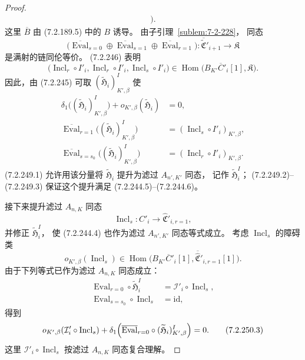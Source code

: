 \begin{proof}
\begin{equation}
\begin{aligned}
\Bigr).
\end{aligned}
\tag{7.2.247}\label{eq:7-2-247}
\end{equation}
这里 $\overline B$ 由 (7.2.189.5)
中的 $B$ 诱导。
由子引理~\ref{sublem:7-2-228}，
同态
\begin{equation}
\bigl(
\overline{\operatorname{Eval}}_{s=0}
\oplus\overline{\operatorname{Eval}}_{s=1}
\oplus\overline{\operatorname{Eval}}_{r=1}
\bigr)
\colon
\overline{\widetilde{\mathfrak C}}'_{i+1}
\longrightarrow\mathfrak K
\tag{7.2.248}\label{eq:7-2-248}
\end{equation}
是满射的链同伦等价。
(7.2.246) 表明
\[
\bigl(
\operatorname{Incl}_r\circ I'_i,
\operatorname{Incl}_r\circ I'_i,
\operatorname{Incl}_s\circ I'_i
\bigr)
\in\operatorname{Hom}\bigl(
B_{K'}\overline C'_i[1],\mathfrak K
\bigr).
\]
因此，由 (7.2.245) 可取
$(\widetilde{\mathfrak H}_i)^I_{K',\beta}$
使
\begin{align}
\delta_1\bigl(
(\widetilde{\mathfrak H}_i)^I_{K',\beta}
\bigr)
+o_{K',\beta}(\widetilde{\mathfrak H}_i)
&=0,
\tag{7.2.249.1}\label{eq:7-2-249-1}\\
\overline{\operatorname{Eval}}_{r=1}
\bigl((\widetilde{\mathfrak H}_i)^I_{K',\beta}\bigr)
&=(\operatorname{Incl}_s\circ I'_i)_{K',\beta},
\tag{7.2.249.2}\label{eq:7-2-249-2}\\
\overline{\operatorname{Eval}}_{s=s_0}
\bigl((\widetilde{\mathfrak H}_i)^I_{K',\beta}\bigr)
&=(\operatorname{Incl}_r\circ I'_i)_{K',\beta}.
\tag{7.2.249.3}\label{eq:7-2-249-3}
\end{align}
(7.2.249.1) 允许用该分量将
$\widetilde{\mathfrak H}_i$
提升为滤过 $A_{n',K'}$ 同态，
记作 $\widetilde{\mathfrak H}_i^I$；
(7.2.249.2)--(7.2.249.3)
保证这个提升满足
(7.2.244.5)--(7.2.244.6)。

接下来提升滤过 $A_{n,K}$ 同态
\[
\operatorname{Incl}_s\colon C'_i\to
\widehat{\mathfrak C}'_{i,r=1},
\]
并修正 $\widetilde{\mathfrak H}_i^I$，
使 (7.2.244.4) 也作为滤过
$A_{n',K'}$ 同态等式成立。
考虑 $\operatorname{Incl}_s$ 的障碍类
\[
o_{K',\beta}(\operatorname{Incl}_s)
\in\operatorname{Hom}\bigl(
B_{K'}\overline C'_i[1],
\overline{\widehat{\mathfrak C}}'_{i,r=1}[1]
\bigr).
\]
由于下列等式已作为滤过 $A_{n,K}$
同态成立：
\begin{align}
\operatorname{Eval}_{r=0}\circ
\widetilde{\mathfrak H}_i^I
&=\mathcal I'_i\circ\operatorname{Incl}_s,
\tag{7.2.250.1}\label{eq:7-2-250-1}\\
\operatorname{Eval}_{s=s_0}\circ
\operatorname{Incl}_s
&=\mathrm{id},
\tag{7.2.250.2}\label{eq:7-2-250-2}
\end{align}
得到
\begin{equation}
o_{K',\beta}(\mathcal I'_i\circ
\operatorname{Incl}_s)
+\delta_1\Bigl(
\overline{\operatorname{Eval}}_{r=0}\circ
(\widetilde{\mathfrak H}_i)^I_{K',\beta}
\Bigr)=0.
\tag{7.2.250.3}\label{eq:7-2-250-3}
\end{equation}
这里 $\mathcal I'_i\circ
\operatorname{Incl}_s$
按滤过 $A_{n,K}$ 同态复合理解。


\end{proof}
